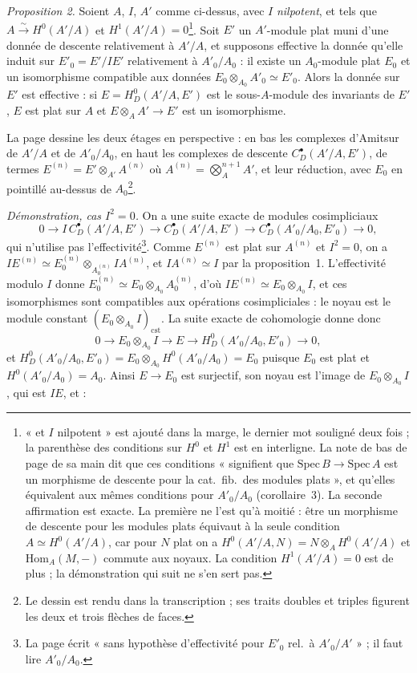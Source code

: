 \documentclass[11pt,a4paper]{article}
\begin{document}
\emph{Proposition 2.} Soient $A$, $I$, $A'$ comme ci-dessus, avec $I$
\emph{nilpotent}, et tels que $A \xrightarrow{\sim} H^0(A'/A)$ et $H^1(A'/A)
= 0$\footnote{« et $I$ nilpotent » est ajouté dans la marge, le dernier mot
souligné deux fois ; la parenthèse des conditions sur $H^0$ et $H^1$ est en
interligne. La note de bas de page de sa main dit que ces conditions
« signifient que $\mathrm{Spec}\, B \to \mathrm{Spec}\, A$ est un morphisme
de descente pour la cat.\ fib.\ des modules plats », et qu'elles équivalent
aux mêmes conditions pour $A'_0/A_0$ (corollaire~3). La seconde affirmation
est exacte. La première ne l'est qu'à moitié : être un morphisme de descente
pour les modules plats équivaut à la seule condition $A \simeq H^0(A'/A)$,
car pour $N$ plat on a $H^0(A'/A, N) = N \otimes_A H^0(A'/A)$ et
$\mathrm{Hom}_A(M, -)$ commute aux noyaux. La condition $H^1(A'/A) = 0$ est
de plus ; la démonstration qui suit ne s'en sert pas.}. Soit $E'$ un
$A'$-module plat muni d'une donnée de descente relativement à $A'/A$, et
supposons effective la donnée qu'elle induit sur $E'_0 = E'/IE'$
relativement à $A'_0/A_0$ : il existe un $A_0$-module plat $E_0$ et un
isomorphisme compatible aux données $E_0 \otimes_{A_0} A'_0 \simeq E'_0$.
Alors la donnée sur $E'$ est effective : si $E = H^0_D(A'/A, E')$ est le
sous-$A$-module des invariants de $E'$, $E$ est plat sur $A$ et $E \otimes_A
A' \to E'$ est un isomorphisme.

La page dessine les deux étages en perspective : en bas les complexes
d'Amitsur de $A'/A$ et de $A'_0/A_0$, en haut les complexes de descente
$C^{\bullet}_D(A'/A, E')$, de termes $E^{(n)} = E' \otimes_{A'} A^{(n)}$ où
$A^{(n)} = \bigotimes^{n+1}_A A'$, et leur réduction, avec $E_0$ en pointillé
au-dessus de $A_0$\footnote{Le dessin est rendu dans la transcription ; ses
traits doubles et triples figurent les deux et trois flèches de faces.}.

\emph{Démonstration, cas $I^2 = 0$.} On a une suite exacte de modules
cosimpliciaux
\[
  0 \to I\, C^{\bullet}_D(A'/A, E') \to C^{\bullet}_D(A'/A, E') \to
  C^{\bullet}_D(A'_0/A_0, E'_0) \to 0 ,
\]
qui n'utilise pas l'effectivité\footnote{La page écrit « sans hypothèse
d'effectivité pour $E'_0$ rel.\ à $A'_0/A'$ » ; il faut lire $A'_0/A_0$.}.
Comme $E^{(n)}$ est plat sur $A^{(n)}$ et $I^2 = 0$, on a $I E^{(n)} \simeq
E^{(n)}_0 \otimes_{A^{(n)}_0} IA^{(n)}$, et $IA^{(n)} \simeq I$ par la
proposition~1. L'effectivité modulo $I$ donne $E^{(n)}_0 \simeq E_0
\otimes_{A_0} A^{(n)}_0$, d'où $IE^{(n)} \simeq E_0 \otimes_{A_0} I$, et ces
isomorphismes sont compatibles aux opérations cosimpliciales : le noyau est le
module constant $(E_0 \otimes_{A_0} I)_{\mathrm{cst}}$. La suite exacte de
cohomologie donne donc
\[
  0 \to E_0 \otimes_{A_0} I \to E \to H^0_D(A'_0/A_0, E'_0) \to 0 ,
\]
et $H^0_D(A'_0/A_0, E'_0) = E_0 \otimes_{A_0} H^0(A'_0/A_0) = E_0$ puisque
$E_0$ est plat et $H^0(A'_0/A_0) = A_0$. Ainsi $E \to E_0$ est surjectif,
son noyau est l'image de $E_0 \otimes_{A_0} I$, qui est $IE$, et :
\end{document}
